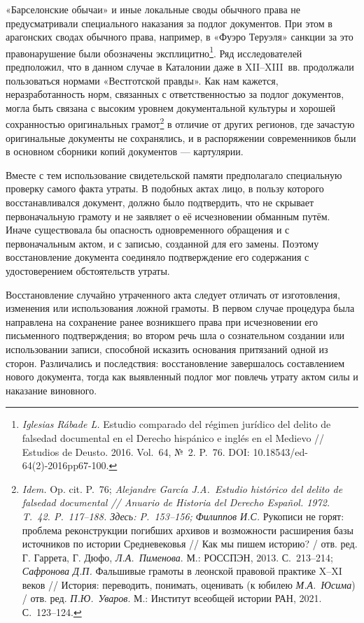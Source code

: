 «Барселонские обычаи» и иные локальные своды обычного права не предусматривали специального наказания за подлог документов. При этом в арагонских сводах обычного права, например, в «Фуэро Теруэля» санкции за это правонарушение были обозначены эксплицитно\footnote{\emph{Iglesias }\emph{Rábade L.} Estudio comparado del régimen jurídico del delito de falsedad documental en el Derecho hispánico e inglés en el Medievo // Estudios de Deusto. 2016. Vol.~64, №~2. P.~76. DOI: 10.18543/ed-64(2)-2016pp67-100.}. Ряд исследователей предположил, что в данном случае в Каталонии даже в XII--XIII~вв. продолжали пользоваться нормами «Вестготской правды». Как нам кажется, неразработанность норм, связанных с ответственностью за подлог документов, могла быть связана с высоким уровнем документальной культуры и хорошей сохранностью оригинальных грамот\footnote{\emph{Idem.} Op. cit. P.~76; \emph{Alejandre García J.A.~Estudio histórico del delito de falsedad documental // Anuario de Historia del Derecho Español. 1972. T.~42. P.~117--188. Здесь: P.~153--156; }\emph{Филиппов И.С.} Рукописи не горят: проблема реконструкции погибших архивов и возможности расширения базы источников по истории Средневековья // Как мы пишем историю? / отв. ред. Г. Гаррета, Г. Дюфо, \emph{Л.А.~Пименова}. М.: РОССПЭН, 2013. С.~213--214; \emph{Сафронова Д.П. }Фальшивые грамоты в леонской правовой практике X--XI веков // История: переводить, понимать, оценивать (к юбилею \emph{М.А.~Юсима}) / отв. ред. \emph{П.Ю.~Уваров}. М.: Институт всеобщей истории РАН, 2021. С.~123--124.} в отличие от других регионов, где зачастую оригинальные документы не сохранялись, и в распоряжении современников были в основном сборники копий документов --- картулярии.

Вместе с тем использование свидетельской памяти предполагало специальную проверку самого факта утраты. В подобных актах лицо, в пользу которого восстанавливался документ, должно было подтвердить, что не скрывает первоначальную грамоту и не заявляет о её исчезновении обманным путём. Иначе существовала бы опасность одновременного обращения и с первоначальным актом, и с записью, созданной для его замены. Поэтому восстановление документа соединяло подтверждение его содержания с удостоверением обстоятельств утраты.

Восстановление случайно утраченного акта следует отличать от изготовления, изменения или использования ложной грамоты. В первом случае процедура была направлена на сохранение ранее возникшего права при исчезновении его письменного подтверждения; во втором речь шла о сознательном создании или использовании записи, способной исказить основания притязаний одной из сторон. Различались и последствия: восстановление завершалось составлением нового документа, тогда как выявленный подлог мог повлечь утрату актом силы и наказание виновного.

